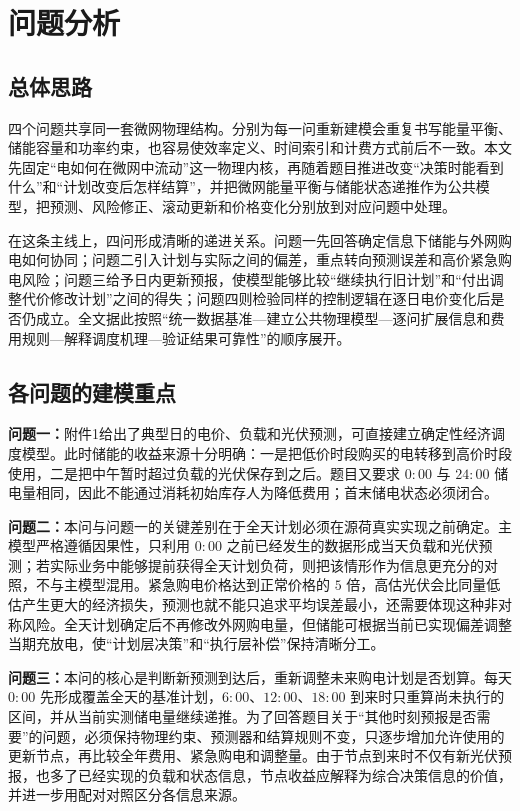 \section{问题分析}

\subsection{总体思路}

四个问题共享同一套微网物理结构。分别为每一问重新建模会重复书写能量平衡、储能容量和功率约束，也容易使效率定义、时间索引和计费方式前后不一致。本文先固定“电如何在微网中流动”这一物理内核，再随着题目推进改变“决策时能看到什么”和“计划改变后怎样结算”，并把微网能量平衡与储能状态递推作为公共模型，把预测、风险修正、滚动更新和价格变化分别放到对应问题中处理。

在这条主线上，四问形成清晰的递进关系。问题一先回答确定信息下储能与外网购电如何协同；问题二引入计划与实际之间的偏差，重点转向预测误差和高价紧急购电风险；问题三给予日内更新预报，使模型能够比较“继续执行旧计划”和“付出调整代价修改计划”之间的得失；问题四则检验同样的控制逻辑在逐日电价变化后是否仍成立。全文据此按照“统一数据基准—建立公共物理模型—逐问扩展信息和费用规则—解释调度机理—验证结果可靠性”的顺序展开。

\subsection{各问题的建模重点}

\indent\textbf{问题一：}附件1给出了典型日的电价、负载和光伏预测，可直接建立确定性经济调度模型。此时储能的收益来源十分明确：一是把低价时段购买的电转移到高价时段使用，二是把中午暂时超过负载的光伏保存到之后。题目又要求 $0{:}00$ 与 $24{:}00$ 储电量相同，因此不能通过消耗初始库存人为降低费用；首末储电状态必须闭合。

\indent\textbf{问题二：}本问与问题一的关键差别在于全天计划必须在源荷真实实现之前确定。主模型严格遵循因果性，只利用 $0{:}00$ 之前已经发生的数据形成当天负载和光伏预测；若实际业务中能够提前获得全天计划负荷，则把该情形作为信息更充分的对照，不与主模型混用。紧急购电价格达到正常价格的 $5$ 倍，高估光伏会比同量低估产生更大的经济损失，预测也就不能只追求平均误差最小，还需要体现这种非对称风险。全天计划确定后不再修改外网购电量，但储能可根据当前已实现偏差调整当期充放电，使“计划层决策”和“执行层补偿”保持清晰分工。

\indent\textbf{问题三：}本问的核心是判断新预测到达后，重新调整未来购电计划是否划算。每天 $0{:}00$ 先形成覆盖全天的基准计划，$6{:}00$、$12{:}00$、$18{:}00$ 到来时只重算尚未执行的区间，并从当前实测储电量继续递推。为了回答题目关于“其他时刻预报是否需要”的问题，必须保持物理约束、预测器和结算规则不变，只逐步增加允许使用的更新节点，再比较全年费用、紧急购电和调整量。由于节点到来时不仅有新光伏预报，也多了已经实现的负载和状态信息，节点收益应解释为综合决策信息的价值，并进一步用配对对照区分各信息来源。

